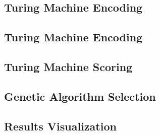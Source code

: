 \subsection{Turing Machine Encoding} 
\subsection{Turing Machine Encoding} 
\subsection{Turing Machine Scoring} 
\subsection{Genetic Algorithm Selection}
\subsection{Results Visualization}

